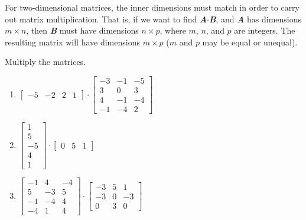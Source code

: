 \begin{mdframed}[style = important, frametitle = {Matrix Multiplication}]
For two-dimensional matrices, the inner dimensions must match in order to 
carry out matrix multiplication. That is, if we want to find \textbf{\textit{
A}}$\cdot$\textbf{\textit{B}}, and \textbf{\textit{A}} has dimensions $m 
\times n$, then \textbf{\textit{B}} must have dimensions $n \times p$, where 
$m$, $n$, and $p$ are integers. The resulting matrix will have dimensions $m 
\times p$ ($m$ and $p$ may be equal or unequal).
\end{mdframed}

\begin{Exercise}[title = {Multiplying Matrices 1}, label = mult_mat1]
Multiply the matrices.
\begin{enumerate}
\item $\begin{bmatrix}
-5 & -2 & 2 & 1
\end{bmatrix} \cdot \begin{bmatrix}
-3 & -1 & -5\\
3 & 0 & 3\\
4 & -1 & -4\\
-1 & -4 & 2
\end{bmatrix}$
\item $\begin{bmatrix}
1\\
5\\
-5\\
4\\
1
\end{bmatrix} \cdot \begin{bmatrix}
0 & 5 & 1
\end{bmatrix}$
\item $\begin{bmatrix}
-1 & 4 & -4\\
5 & -3 & 5\\
-1 & -4 & 4\\
-4 & 1 & 4
\end{bmatrix} \cdot \begin{bmatrix}
-3 & 5 & 1\\
-3 & 0 & -3\\
0 & 3 & 0
\end{bmatrix}$
\end{enumerate}
\end{Exercise}

